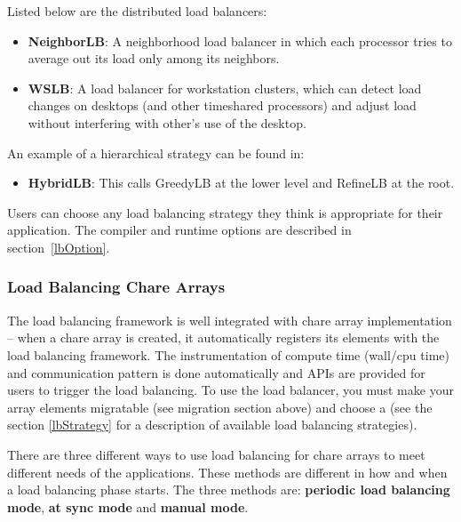 Listed below are the distributed load balancers:
\begin{itemize}
\item {\bf NeighborLB}:   A neighborhood load balancer in which each processor tries to average out its load only among its neighbors.
\item {\bf WSLB}:   A load balancer for workstation clusters, which can detect load changes on desktops (and other timeshared processors) and adjust load without interfering with other's use of the desktop.
\end{itemize}

An example of a hierarchical strategy can be found in:
\begin{itemize}
\item {\bf HybridLB}: This calls GreedyLB at the lower level and RefineLB at
the root.
\end{itemize}

Users can choose any load balancing strategy they think is appropriate for their
application. The compiler and runtime options are described in
section~\ref{lbOption}.


\subsubsection{Load Balancing Chare Arrays}
\label{lbarray}

The load balancing framework is well integrated with chare array implementation
-- when a chare array is created, it automatically registers its elements with
the load balancing framework. The instrumentation of compute time (wall/cpu
time) and communication pattern is done automatically and APIs are provided
for users to trigger the load balancing.  To use the load balancer, you must
make your array elements migratable (see migration section above) and choose a
 (see the section \ref{lbStrategy} for a
description of available load balancing strategies).

There are three different ways to use load balancing for chare arrays to meet
different needs of the applications. These methods are different in how and
when a load balancing phase starts. The three methods are: {\bf periodic load
balancing mode}, {\bf at sync mode} and {\bf manual mode}.

